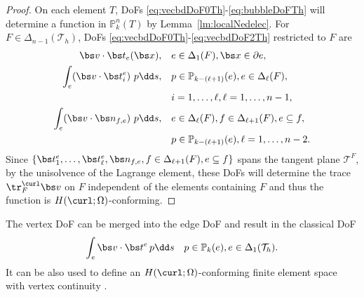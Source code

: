 \begin{proof}
On each element $T$, DoFs \eqref{eq:vecbdDoF0Th}-\eqref{eq:bubbleDoFTh} will determine a function in $\mathbb P_k^n(T)$ by Lemma~\ref{lm:localNedelec}. For $F\in\Delta_{n-1}(\mathcal T_h)$, DoFs \eqref{eq:vecbdDoF0Th}-\eqref{eq:vecbdDoF2Th} restricted to $F$ are
\begin{align*}
\bs v\cdot \bs t_{e}({\bs x}), & \quad e\in \Delta_{1}(F), {\bs x}\in \partial e, \\
\int_e (\bs v\cdot \bs t_i^e)\ p \dd s, &\quad  p\in \mathbb P_{k - (\ell +1)} (e), e\in \Delta_{\ell}(F),\\
& \quad  i=1,\ldots, \ell, \ell = 1,\ldots, n-1, \notag\\
\int_e (\bs v\cdot \bs n_{f,e})\ p \dd s, &\quad  e\in \Delta_{\ell}(F), f\in \Delta_{\ell+1}(F), e\subseteq f, \\
& \quad p\in \mathbb P_{k - (\ell +1)} (e), \ell = 1,\ldots, n-2.
\end{align*}
Since $\{\bs t_1^e, \ldots, \bs t_{\ell}^e, \bs n_{f,e}, f\in \Delta_{\ell+1}(F), e\subseteq f\}$ spans the tangent plane $\mathscr T^F$, by the unisolvence of the Lagrange element, these DoFs will determine the trace $\tr^{\curl}_F\bs v$ on $F$ independent of the elements containing $F$ and thus the function is $H(\curl;\Omega)$-conforming. 
\end{proof}

The vertex DoF can be merged into the edge DoF and result in the classical DoF
$$
\int_e \bs v\cdot \bs t^e\, p \dd s \quad p\in \mathbb P_{k} (e), e\in \Delta_1(\mathcal T_h).
$$
It can be also used to define an $H(\curl;\Omega)$-conforming finite element space with vertex continuity \cite{Christiansen;Hu;Hu:2018finite}. 


